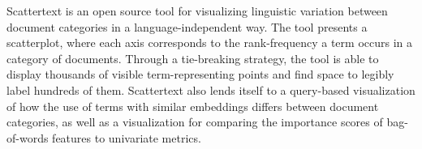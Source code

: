 Scattertext is an open source tool for visualizing linguistic variation between document categories in a language-independent way. The tool presents a scatterplot, where each axis corresponds to the rank-frequency a term occurs in a category of documents.  Through a tie-breaking strategy, the tool is able to display thousands of visible term-representing points and find space to legibly label hundreds of them.   Scattertext also lends itself to a query-based visualization of how the use of terms with similar embeddings differs between document categories, as well as a visualization for comparing the importance scores of bag-of-words features to univariate metrics.
